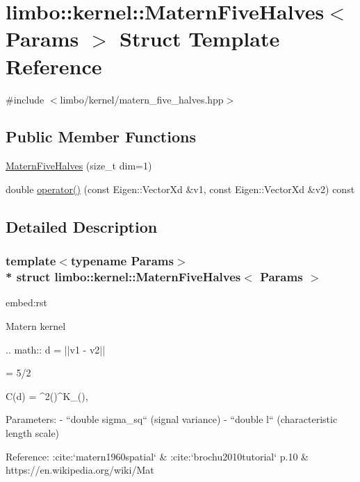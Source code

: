 \hypertarget{structlimbo_1_1kernel_1_1_matern_five_halves}{}\section{limbo\+:\+:kernel\+:\+:Matern\+Five\+Halves$<$ Params $>$ Struct Template Reference}
\label{structlimbo_1_1kernel_1_1_matern_five_halves}


{\ttfamily \#include $<$limbo/kernel/matern\+\_\+five\+\_\+halves.\+hpp$>$}

\subsection*{Public Member Functions}
\begin{DoxyCompactItemize}
\item 
\hyperlink{structlimbo_1_1kernel_1_1_matern_five_halves_ad574e55051fb4728271945cb46ea11f0}{Matern\+Five\+Halves} (size\+\_\+t dim=1)
\item 
double \hyperlink{structlimbo_1_1kernel_1_1_matern_five_halves_a2949874230e0cd3f8116de67c3824987}{operator()} (const Eigen\+::\+Vector\+Xd \&v1, const Eigen\+::\+Vector\+Xd \&v2) const 
\end{DoxyCompactItemize}


\subsection{Detailed Description}
\subsubsection*{template$<$typename Params$>$\\*
struct limbo\+::kernel\+::\+Matern\+Five\+Halves$<$ Params $>$}

\begin{DoxyVerb}embed:rst

Matern kernel

.. math::
  d = ||v1 - v2||

  \nu = 5/2

  C(d) = \sigma^2\Bigg(\sqrt{2\nu}\Bigg)^\nu K_\nu\Bigg(\sqrt{2\nu}\Bigg),


Parameters:
  - ``double sigma_sq`` (signal variance)
  - ``double l`` (characteristic length scale)

Reference: :cite:`matern1960spatial` & :cite:`brochu2010tutorial` p.10 & https://en.wikipedia.org/wiki/Mat%
\end{DoxyVerb}
 

